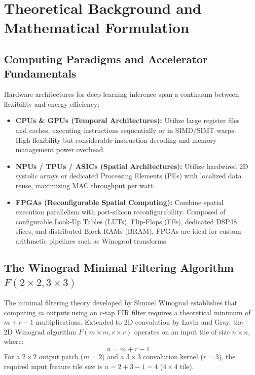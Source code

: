 \documentclass[12pt,a4paper]{article}
\begin{document}
\section{Theoretical Background and Mathematical Formulation}

\subsection{Computing Paradigms and Accelerator Fundamentals}
Hardware architectures for deep learning inference span a continuum between flexibility and energy efficiency:
\begin{itemize}
    \item \textbf{CPUs \& GPUs (Temporal Architectures):} Utilize large register files and caches, executing instructions sequentially or in SIMD/SIMT warps. High flexibility but considerable instruction decoding and memory management power overhead.
    \item \textbf{NPUs / TPUs / ASICs (Spatial Architectures):} Utilize hardwired 2D systolic arrays or dedicated Processing Elements (PEs) with localized data reuse, maximizing MAC throughput per watt.
    \item \textbf{FPGAs (Reconfigurable Spatial Computing):} Combine spatial execution parallelism with post-silicon reconfigurability. Composed of configurable Look-Up Tables (LUTs), Flip-Flops (FFs), dedicated DSP48 slices, and distributed Block RAMs (BRAM), FPGAs are ideal for custom arithmetic pipelines such as Winograd transforms.
\end{itemize}

\subsection{The Winograd Minimal Filtering Algorithm $F(2 \times 2, 3 \times 3)$}
The minimal filtering theory developed by Shmuel Winograd establishes that computing $m$ outputs using an $r$-tap FIR filter requires a theoretical minimum of $m + r - 1$ multiplications. Extended to 2D convolution by Lavin and Gray, the 2D Winograd algorithm $F(m \times m, r \times r)$ operates on an input tile of size $n \times n$, where:
\begin{equation}
    n = m + r - 1
\end{equation}
For a $2 \times 2$ output patch ($m=2$) and a $3 \times 3$ convolution kernel ($r=3$), the required input feature tile size is $n = 2 + 3 - 1 = 4$ ($4 \times 4$ tile).
\end{document}
